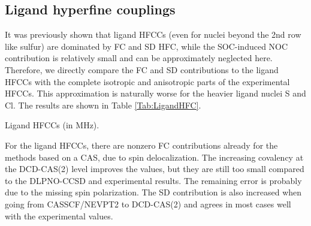 \subsection{Ligand hyperfine couplings}
\label{Sec:ligandHFC}
It was previously shown that ligand HFCCs (even for nuclei beyond the 2nd row like sulfur) are dominated by FC and SD HFC,\cite{Neese_2003_3939} while the SOC-induced NOC contribution is relatively small and can be approximately neglected here. Therefore, we directly compare the FC and SD contributions to the ligand HFCCs with the complete isotropic and anisotropic parts of the experimental HFCCs. This approximation is naturally worse for the heavier ligand nuclei S and Cl. The results are shown in Table \ref{Tab:LigandHFC}.
\begin{table}
\centering
\small
\ttabbox
{\caption[Ligand HFCCs.]{Ligand HFCCs (in MHz).}
\label{Tab:LigandHFC}}
{
}
\end{table}
For the ligand HFCCs, there are nonzero FC contributions already for the methods based on a CAS, due to spin delocalization. The increasing covalency at the DCD-CAS(2) level improves the values, but they are still too small compared to the DLPNO-CCSD and experimental results. The remaining error is probably due to the missing spin polarization. The SD contribution is also increased when going from CASSCF/NEVPT2 to DCD-CAS(2) and agrees in most cases well with the experimental values.

